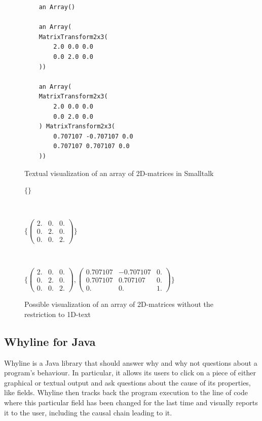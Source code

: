 \documentclass[english]{acm_proc_article-sp}
\begin{document}
\begin{figure}[h]
	\begin{verbatim}
    an Array()

    an Array(
    MatrixTransform2x3(
        2.0 0.0 0.0
        0.0 2.0 0.0
    ))

    an Array(
    MatrixTransform2x3(
        2.0 0.0 0.0
        0.0 2.0 0.0
    ) MatrixTransform2x3(
        0.707107 -0.707107 0.0
        0.707107 0.707107 0.0
    ))
	\end{verbatim}
	\caption[Bad nesting of 2D-matrix array]{Textual visualization of an array of 2D-matrices in Smalltalk}
	\label{nested-matrix-problem}
\end{figure}
\begin{figure}[h]
\raggedright
	$\{\}$
	\begin{verbatim}
	
	\end{verbatim}
	$\{\begin{pmatrix}
	2. & 0. & 0. \\
	0. & 2. & 0. \\
	0. & 0. & 2.
	\end{pmatrix}\}$
	\begin{verbatim}
	
	\end{verbatim}
	$\{\begin{pmatrix}
	2. & 0. & 0. \\
	0. & 2. & 0. \\
	0. & 0. & 2.
	\end{pmatrix},
	\begin{pmatrix}
	0.707107 & -0.707107 & 0. \\
	0.707107 & 0.707107 & 0. \\
	0. & 0. & 1.
	\end{pmatrix}\}$
	\caption[Ideal nesting of 2D-matrix array]{Possible visualization of an array of 2D-matrices without the restriction to 1D-text}
	\label{nested-matrix-idea}
\end{figure}

\subsection{Whyline for Java}
Whyline\cite{Ko04a} is a Java library that should answer why and why not questions about a program's behaviour. In particular, it allows its users to click on a piece of either graphical or textual output and ask questions about the cause of its properties, like fields. Whyline then tracks back the program execution to the line of code where this particular field has been changed for the last time and visually reports it to the user, including the causal chain leading to it.
\end{document}
